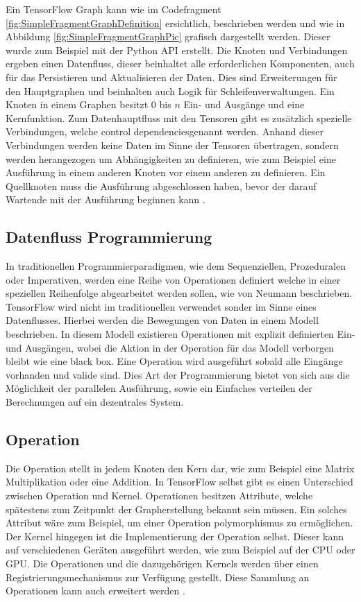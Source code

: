 Ein TensorFlow Graph kann wie im Codefragment \ref{fig:SimpleFragmentGraphDefinition} ersichtlich, beschrieben werden und wie in Abbildung \ref{fig:SimpleFragmentGraphPic} grafisch dargestellt werden.
Dieser wurde zum Beispiel mit der Python API erstellt.
Die Knoten und Verbindungen ergeben einen Datenfluss, dieser beinhaltet alle erforderlichen Komponenten, auch für das Persistieren und Aktualisieren der Daten.
Dies sind Erweiterungen für den Hauptgraphen und beinhalten auch Logik für Schleifenverwaltungen.
Ein Knoten in einem Graphen besitzt $0$ bis $n$ Ein- und Ausgänge und eine Kernfunktion. 
Zum Datenhauptfluss mit den Tensoren gibt es zusätzlich spezielle Verbindungen, welche \glqq control dependencies\grqq genannt werden. 
Anhand dieser Verbindungen werden keine Daten im Sinne der Tensoren übertragen, sondern werden herangezogen um Abhängigkeiten zu definieren, wie zum Beispiel eine Ausführung in einem anderen Knoten vor einem anderen zu definieren.
Ein Quellknoten muss die Ausführung abgeschlossen haben, bevor der darauf Wartende mit der Ausführung beginnen kann \cite{wp2015tensorflow}. \\ 

\subsection{Datenfluss Programmierung}

In traditionellen Programmierparadigmen, wie dem Sequenziellen, Prozeduralen oder Imperativen, werden eine Reihe von Operationen definiert welche in einer speziellen Reihenfolge abgearbeitet werden sollen, wie von Neumann beschrieben. 
TensorFlow wird nicht im traditionellen verwendet sonder im Sinne eines Datenflusses. 
Hierbei werden die Bewegungen von Daten in einem Modell beschrieben. 
In diesem Modell existieren Operationen mit explizit definierten Ein- und Ausgängen, wobei die Aktion in der Operation für das Modell verborgen bleibt wie eine \glqq black box\grqq. 
Eine Operation wird ausgeführt sobald alle Eingänge vorhanden und valide sind. 
Dies Art der Programmierung bietet von sich aus die Möglichkeit der parallelen Ausführung, sowie ein Einfaches verteilen der Berechnungen auf ein dezentrales System. 

\subsection{Operation}

Die Operation stellt in jedem Knoten den Kern dar, wie zum Beispiel eine Matrix Multiplikation oder eine Addition.
In TensorFlow selbst gibt es einen Unterschied zwischen Operation und Kernel.
Operationen besitzen Attribute, welche spätestens zum Zeitpunkt der Grapherstellung bekannt sein müssen. 
Ein solches Attribut wäre zum Beispiel, um einer Operation polymorphismus zu ermöglichen.  
Der Kernel hingegen ist die Implementierung der Operation selbst. 
Dieser kann auf verschiedenen Geräten ausgeführt werden, wie zum Beispiel auf der CPU oder GPU.
Die Operationen und die dazugehörigen Kernels werden über einen Registrierungsmechanismus zur Verfügung gestellt. 
Diese Sammlung an Operationen kann auch erweitert werden \cite{wp2015tensorflow}. 

